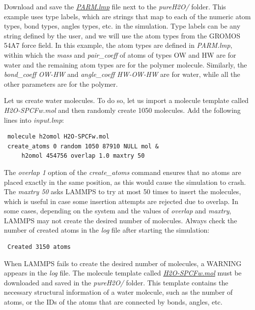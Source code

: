 \documentclass[9pt,tutorial]{livecoms}
\newcommand{\filepath}{https://raw.githubusercontent.com/lammpstutorials/lammpstutorials-article/main/files/}
\begin{document}
Download and save the
\href{\filepath tutorial3/PARM.lmp}{\textit{PARM.lmp}}
file next to the \textit{pureH2O/} folder. This example uses type labels, which
are strings that map to each of the numeric atom types, bond types, angles types,
etc. in the simulation. Type labels can be any string defined by the user, and we
will use the atom types from the GROMOS 54A7 force field. In this example, the atom
types are defined in \textit{PARM.lmp}, within which the \textit{mass}
and \textit{pair\_coeff} of atoms of types OW and HW are for water and the remaining
atom types are for the polymer molecule. Similarly, the \textit{bond\_coeff OW-HW}
and \textit{angle\_coeff HW-OW-HW} are for water, while all the other parameters
are for the polymer.

Let us create water molecules. To do so, let us import a molecule template called
\textit{H2O-SPCFw.mol} and then randomly create 1050 molecules. Add the following
lines into \textit{input.lmp}:
{\normalsize \begin{verbatim}
 molecule h2omol H2O-SPCFw.mol
 create_atoms 0 random 1050 87910 NULL mol &
     h2omol 454756 overlap 1.0 maxtry 50
\end{verbatim}}
The \textit{overlap 1} option of the \textit{create\_atoms} command ensures
that no atoms are placed exactly in the same position, as this would cause the
simulation to crash. The \textit{maxtry 50} asks LAMMPS to try at most 50 times
to insert the molecules, which is useful in case some insertion attempts are
rejected due to overlap. In some cases, depending on the system and the values
of \textit{overlap} and \textit{maxtry}, LAMMPS may not create the desired number
of molecules. Always check the number of created atoms in the \textit{log} file
after starting the simulation:
{\normalsize \begin{verbatim}
 Created 3150 atoms
\end{verbatim}}
When LAMMPS fails to create the desired number of molecules, a WARNING appears
in the \textit{log} file. The molecule template called
\href{\filepath tutorial3/pureH2O/H2O-SPCFw.mol}{\textit{H2O-SPCFw.mol}}
must be downloaded and saved in the \textit{pureH2O/} folder. This template contains
the necessary structural information of a water molecule, such as the number of
atoms, or the IDs of the atoms that are connected by bonds, angles, etc.
\end{document}
